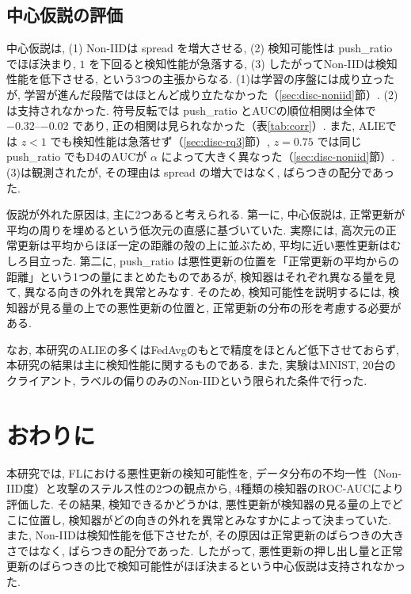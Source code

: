\documentclass[a4j, dvipdfmx]{jsarticle}
\newcommand{\PushRatio}{\textrm{push\_ratio}}
\newcommand{\Spread}{\textrm{spread}}
\begin{document}
\subsection{中心仮説の評価}
\label{sec:disc-hyp}

中心仮説は, (1) Non-IIDは \Spread{} を増大させる, (2) 検知可能性は \PushRatio{} でほぼ決まり, $1$ を下回ると検知性能が急落する, (3) したがってNon-IIDは検知性能を低下させる, という3つの主張からなる. (1)は学習の序盤には成り立ったが, 学習が進んだ段階ではほとんど成り立たなかった（\ref{sec:disc-noniid}節）. (2)は支持されなかった. 符号反転では \PushRatio{} とAUCの順位相関は全体で $-0.32$--$-0.02$ であり, 正の相関は見られなかった（表\ref{tab:corr}）. また, ALIEでは $z<1$ でも検知性能は急落せず（\ref{sec:disc-rq3}節）, $z=0.75$ では同じ \PushRatio{} でもD4のAUCが $\alpha$ によって大きく異なった（\ref{sec:disc-noniid}節）. (3)は観測されたが, その理由は \Spread{} の増大ではなく, ばらつきの配分であった.

仮説が外れた原因は, 主に2つあると考えられる. 第一に, 中心仮説は, 正常更新が平均の周りを埋めるという低次元の直感に基づいていた. 実際には, 高次元の正常更新は平均からほぼ一定の距離の殻の上に並ぶため, 平均に近い悪性更新はむしろ目立った. 第二に, \PushRatio{} は悪性更新の位置を「正常更新の平均からの距離」という1つの量にまとめたものであるが, 検知器はそれぞれ異なる量を見て, 異なる向きの外れを異常とみなす. そのため, 検知可能性を説明するには, 検知器が見る量の上での悪性更新の位置と, 正常更新の分布の形を考慮する必要がある.

なお, 本研究のALIEの多くはFedAvgのもとで精度をほとんど低下させておらず, 本研究の結果は主に検知性能に関するものである. また, 実験はMNIST, 20台のクライアント, ラベルの偏りのみのNon-IIDという限られた条件で行った.

\section{おわりに}
\label{sec:conclusion}

本研究では, FLにおける悪性更新の検知可能性を, データ分布の不均一性（Non-IID度）と攻撃のステルス性の2つの観点から, 4種類の検知器のROC-AUCにより評価した. その結果, 検知できるかどうかは, 悪性更新が検知器の見る量の上でどこに位置し, 検知器がどの向きの外れを異常とみなすかによって決まっていた. また, Non-IIDは検知性能を低下させたが, その原因は正常更新のばらつきの大きさではなく, ばらつきの配分であった. したがって, 悪性更新の押し出し量と正常更新のばらつきの比で検知可能性がほぼ決まるという中心仮説は支持されなかった.
\end{document}
